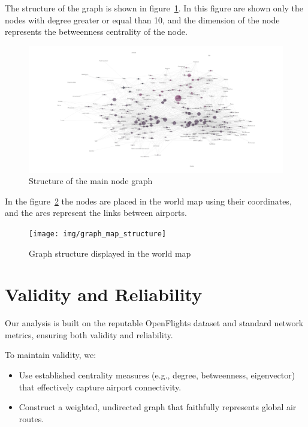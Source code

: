 \documentclass[12pt]{article}
\begin{document}
    The structure of the graph is shown in figure~\ref{fig:graph-structure}.
    In this figure are shown only the nodes with degree greater or equal than 10, and the dimension of the node represents the betweenness centrality of the node.
    \begin{figure}[H]
        \centering
        \includegraphics[width=1\linewidth]{img/graph_structure}
        \caption{Structure of the main node graph}
        \label{fig:graph-structure}
    \end{figure}

    In the figure~\ref{fig:world-graph} the nodes are placed in the world map using their coordinates, and the arcs represent the links between airports.

    \begin{figure}[H]
        \centering
        \texttt{[image: img/graph\_map\_structure]}
        \caption{Graph structure displayed in the world map}
        \label{fig:world-graph}
    \end{figure}


    \section{Validity and Reliability}\label{sec:validity-and-reliability}
    Our analysis is built on the reputable OpenFlights dataset and standard network metrics, ensuring both validity and reliability.

    To maintain validity, we:
    \begin{itemize}
        \item Use established centrality measures (e.g., degree, betweenness, eigenvector) that effectively capture airport connectivity.
        \item Construct a weighted, undirected graph that faithfully represents global air routes.
    \end{itemize}
\end{document}
